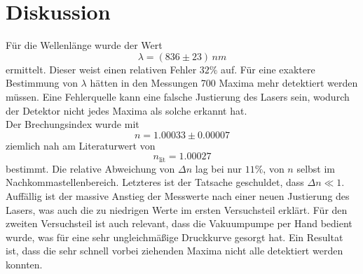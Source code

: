 \section{Diskussion}
\label{sec:Diskussion}

Für die Wellenlänge wurde der Wert
\[
	\lambda = (836 \pm 23) \, \si{nm}
\]
ermittelt. Dieser weist einen relativen Fehler $32\%$ auf. Für eine exaktere Bestimmung
von $\lambda$ hätten in den Messungen 700 Maxima mehr detektiert werden müssen. Eine
Fehlerquelle kann eine falsche Justierung des Lasers sein, wodurch der Detektor nicht
jedes Maxima als solche erkannt hat.
\\
Der Brechungsindex wurde mit 
\[
	n = 1.00033 \pm 0.00007 
\]
ziemlich nah am Literaturwert \cite{reflactiveindex} von
\[
	n_\text{lit} = 1.00027
\]
bestimmt. Die relative Abweichung von $\Delta n$ lag bei nur $11\%$, von $n$ selbst im
Nachkommastellenbereich. Letzteres ist der Tatsache geschuldet, dass $\Delta n \ll 1$.
Auffällig ist der massive Anstieg der Messwerte nach einer neuen Justierung des Lasers,
was auch die zu niedrigen Werte im ersten Versuchsteil erklärt. Für den zweiten
Versuchsteil ist auch relevant, dass die Vakuumpumpe per Hand bedient wurde, was für eine
sehr ungleichmäßige Druckkurve gesorgt hat. Ein Resultat ist, dass die sehr schnell vorbei
ziehenden Maxima nicht alle detektiert werden konnten.

